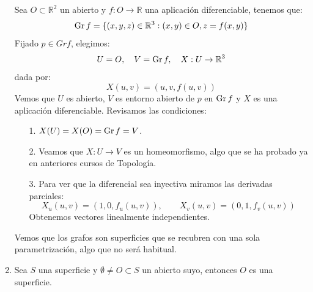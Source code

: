 \begin{ejemplo}
\begin{enumerate}
            Sea $O\subset \mathbb{R}^2$ un abierto y $f:O\to \mathbb{R}$ una aplicación diferenciable, tenemos que:
            \begin{equation*}
                \Gr f = \{(x,y,z)\in \mathbb{R}^3 : (x,y)\in O, z=f(x,y)\}
            \end{equation*}
            Fijado $p\in Gr f$, elegimos:
            \begin{equation*}
                U = O, \quad V = \Gr f, \quad X:U\to \mathbb{R}^3
            \end{equation*}
            dada por:
            \begin{equation*}
                X(u,v) = (u,v,f(u,v))
            \end{equation*}
            Vemos que $U$ es abierto, $V$ es entorno abierto de $p$ en $\Gr f$ y $X$ es una aplicación diferenciable. Revisamos las condiciones:
            \begin{enumerate}[label=\alph*)]
                \item[1.] $X(U) = X(O) = \Gr f = V$.
                \item[2.] Veamos que $X:U\to V$ es un homeomorfismo, algo que se ha probado ya en anteriores cursos de Topología.
                \item[3.] Para ver que la diferencial sea inyectiva miramos las derivadas parciales:
                    \begin{equation*}
                        X_u(u,v) = (1,0,f_u(u,v)), \qquad X_v(u,v) = (0, 1, f_v(u,v))
                    \end{equation*}
                    Obtenemos vectores linealmente independientes.
            \end{enumerate}
            Vemos que los grafos son superficies que se recubren con una sola parametrización, algo que no será habitual.
        \item Sea $S$ una superficie y $\emptyset \neq O\subset S$ un abierto suyo, entonces $O$ es una superficie.


\end{enumerate}
\end{ejemplo}
